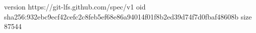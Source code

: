 version https://git-lfs.github.com/spec/v1
oid sha256:932ebc9ecf42cefc2c8feb5ef68e86a94014f01f8b2ed39d74f7d0fbaf48608b
size 87544

